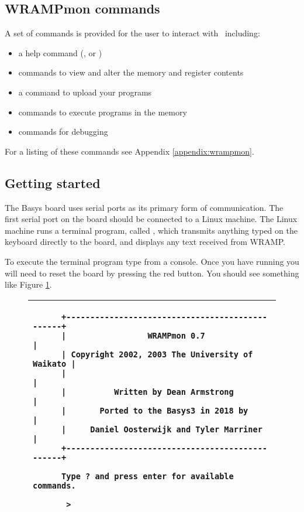\subsection{WRAMPmon commands}
A set of commands is provided for the user to interact with \WRAMPmon\
including:

\begin{itemize}
\item a help command (, or )
\item commands to view and alter the memory and register contents
\item a command to upload your programs
\item commands to execute programs in the memory
\item commands for debugging
\end{itemize}

For a listing of these commands see Appendix \ref{appendix:wrampmon}.

\subsection{Getting started}
The Basys board uses serial ports as its primary form of communication.
The first serial port on the board should be connected to a Linux
machine. The Linux machine runs a terminal program, called
, which transmits anything typed on the keyboard
directly to the board, and displays any text received from WRAMP.

To execute the terminal program type  from a console.
Once you have \src{remote} running you will need to reset the
board by pressing the red  button. You should see
something like Figure \ref{wrampmon}.

\begin{figure}[h]
\begin{center}
\begin{tabular}{|p{15cm}|}
\hline
\begin{verbatim}
      +------------------------------------------------+
      |                 WRAMPmon 0.7                   |
      | Copyright 2002, 2003 The University of Waikato |
      |                                                |
      |          Written by Dean Armstrong             |
      |       Ported to the Basys3 in 2018 by          |
      |     Daniel Oosterwijk and Tyler Marriner       |
      +------------------------------------------------+
      
      Type ? and press enter for available commands.
      
       > 
\end{verbatim}
\\
\hline
\end{tabular}
\end{center}

\caption{\WRAMPmon}
\label{wrampmon}
\end{figure}

